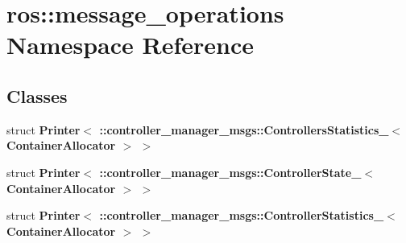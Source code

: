 \section{ros\-:\-:message\-\_\-operations \-Namespace \-Reference}
\label{namespaceros_1_1message__operations}
\subsection*{\-Classes}
\begin{DoxyCompactItemize}
\item 
struct {\bf \-Printer$<$ \-::controller\-\_\-manager\-\_\-msgs\-::\-Controllers\-Statistics\-\_\-$<$ Container\-Allocator $>$ $>$}
\item 
struct {\bf \-Printer$<$ \-::controller\-\_\-manager\-\_\-msgs\-::\-Controller\-State\-\_\-$<$ Container\-Allocator $>$ $>$}
\item 
struct {\bf \-Printer$<$ \-::controller\-\_\-manager\-\_\-msgs\-::\-Controller\-Statistics\-\_\-$<$ Container\-Allocator $>$ $>$}
\end{DoxyCompactItemize}
